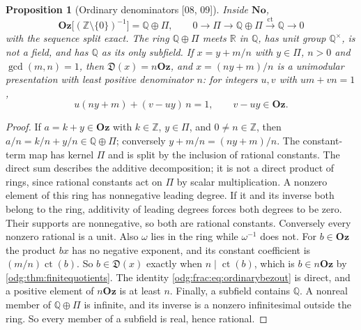 \documentclass[11pt,oneside]{article}
\numberwithin{equation}{section}
\newtheorem{proposition}[proposition]{Proposition}
\theoremstyle{definition}
\theoremstyle{remark}
\newcommand{\No}{\mathbf{No}}
\newcommand{\Oz}{\mathbf{Oz}}
\newcommand{\Z}{\mathbb Z}
\newcommand{\Q}{\mathbb Q}
\newcommand{\R}{\mathbb R}
\newcommand{\ct}{\operatorname{ct}}
\newcommand{\src}[1]{\textup{\textsf{\small[#1]}}}
\newcommand{\Den}{\mathfrak D}
\begin{document}
\begin{proposition}[Ordinary denominators \src{08, 09}]\label{odg:frac:prop:ordinary}
Inside $\No$,
\[
 \Oz\bigl[(\Z\setminus\{0\})^{-1}\bigr]=\Q\oplus\Pi,
 \qquad
 0\longrightarrow\Pi\longrightarrow\Q\oplus\Pi\xrightarrow{\ \ct\ }\Q\longrightarrow0
\]
with the sequence split exact. The ring $\Q\oplus\Pi$ meets $\R$ in $\Q$, has
unit group $\Q^\times$, is not a field, and has $\Q$ as its only subfield. If
$x=y+m/n$ with $y\in\Pi$, $n>0$ and $\gcd(m,n)=1$, then $\Den(x)=n\Oz$, and
$x=(ny+m)/n$ is a unimodular presentation with least positive denominator $n$:
for integers $u,v$ with $um+vn=1$,
\begin{equation}\label{odg:frac:eq:ordinarybezout}
 u(ny+m)+(v-uy)\,n=1,\qquad v-uy\in\Oz .
\end{equation}
\end{proposition}
\begin{proof}
If $a=k+y\in\Oz$ with $k\in\Z$, $y\in\Pi$, and $0\ne n\in\Z$, then
$a/n=k/n+y/n\in\Q\oplus\Pi$; conversely $y+m/n=(ny+m)/n$.
The constant-term map has kernel $\Pi$ and is split by the inclusion of
rational constants. The direct sum describes the additive decomposition;
it is not a direct product of rings, since rational constants act on $\Pi$
by scalar multiplication. A nonzero element of this ring has nonnegative
leading degree. If it and its inverse both belong to the ring, additivity
of leading degrees forces both degrees to be zero. Their supports are
nonnegative, so both are rational constants. Conversely every nonzero
rational is a unit. Also $\omega$ lies in the ring while $\omega^{-1}$ does not. For
$b\in\Oz$ the product $bx$ has no negative exponent, and its constant
coefficient is $(m/n)\ct(b)$. So $b\in\Den(x)$ exactly when $n\mid\ct(b)$,
which is $b\in n\Oz$ by \cref{odg:thm:finitequotients}. The identity
\eqref{odg:frac:eq:ordinarybezout} is direct, and a positive element of $n\Oz$
is at least $n$. Finally, a subfield contains $\Q$. A nonreal member of
$\Q\oplus\Pi$ is infinite, and its inverse is a nonzero infinitesimal outside
the ring. So every member of a subfield is real, hence rational.
\end{proof}
\end{document}
